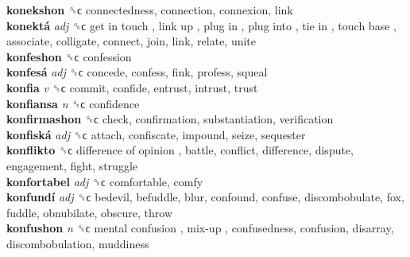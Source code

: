 \textbf{konekshon} ␝ϲ  connectedness, connection, connexion, link  \\
\textbf{konektá} \emph{adj}  ␝ϲ   get in touch ,  link up ,  plug in ,  plug into ,  tie in ,  touch base , associate, colligate, connect, join, link, relate, unite  \\
\textbf{konfeshon} ␝ϲ  confession  \\
\textbf{konfesá} \emph{adj}  ␝ϲ  concede, confess, fink, profess, squeal  \\
\textbf{konfia} \emph{v}  ␝ϲ  commit, confide, entrust, intrust, trust  \\
\textbf{konfiansa} \emph{n}  ␝ϲ  confidence  \\
\textbf{konfirmashon} ␝ϲ  check, confirmation, substantiation, verification  \\
\textbf{konfiská} \emph{adj}  ␝ϲ  attach, confiscate, impound, seize, sequester  \\
\textbf{konflikto} ␝ϲ   difference of opinion , battle, conflict, difference, dispute, engagement, fight, struggle  \\
\textbf{konfortabel} \emph{adj}  ␝ϲ  comfortable, comfy  \\
\textbf{konfundí} \emph{adj}  ␝ϲ  bedevil, befuddle, blur, confound, confuse, discombobulate, fox, fuddle, obnubilate, obscure, throw  \\
\textbf{konfushon} \emph{n}  ␝ϲ   mental confusion ,  mix-up , confusedness, confusion, disarray, discombobulation, muddiness  \\
